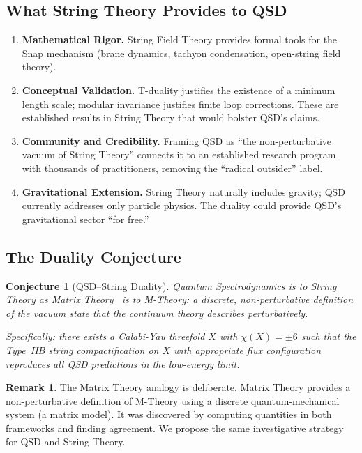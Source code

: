 \documentclass[11pt,a4paper]{article}
\newtheorem{conjecture}[theorem]{Conjecture}
\theoremstyle{definition}
\newtheorem{remark}[theorem]{Remark}
\begin{document}
\subsection{What String Theory Provides to QSD}

\begin{enumerate}
    \item \textbf{Mathematical Rigor.}  String Field Theory provides
          formal tools for the Snap mechanism (brane dynamics, tachyon
          condensation, open-string field theory).

    \item \textbf{Conceptual Validation.}  T-duality justifies the
          existence of a minimum length scale; modular invariance justifies
          finite loop corrections.  These are established results in String
          Theory that would bolster QSD's claims.

    \item \textbf{Community and Credibility.}  Framing QSD as ``the
          non-perturbative vacuum of String Theory'' connects it to an
          established research program with thousands of practitioners,
          removing the ``radical outsider'' label.

    \item \textbf{Gravitational Extension.}  String Theory naturally
          includes gravity; QSD currently addresses only particle physics.
          The duality could provide QSD's gravitational sector ``for
          free.''
\end{enumerate}

\subsection{The Duality Conjecture}

\begin{conjecture}[QSD--String Duality]
\label{conj:duality}
Quantum Spectrodynamics is to String Theory as Matrix Theory~\cite{BFSS1997} is to M-Theory: a discrete, non-perturbative definition of the vacuum state that the continuum theory describes perturbatively.

Specifically: there exists a Calabi-Yau threefold $X$ with $\chi(X) = \pm 6$
such that the Type~IIB string compactification on $X$ with appropriate
flux configuration reproduces all QSD predictions in the low-energy limit.
\end{conjecture}

\begin{remark}
The Matrix Theory analogy is deliberate.  Matrix Theory
provides a non-perturbative definition of M-Theory using a discrete
quantum-mechanical system (a matrix model).  It was discovered by
computing quantities in both frameworks and finding agreement.  We propose
the same investigative strategy for QSD and String Theory.
\end{remark}
\end{document}
